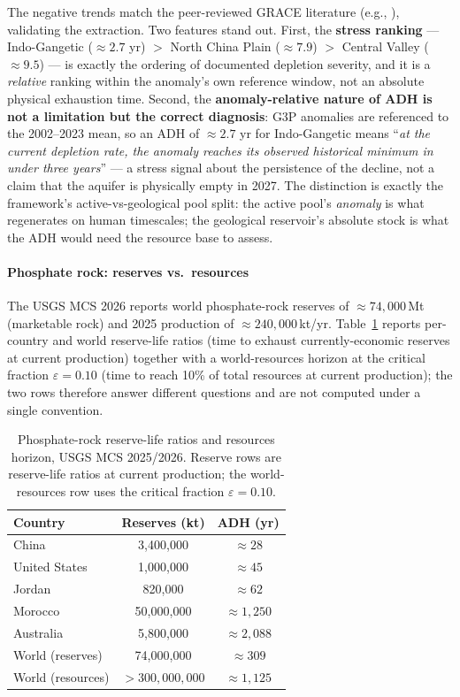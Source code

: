 \documentclass[twocolumn,10pt]{article}
\begin{document}
The negative trends match the peer-reviewed GRACE literature (e.g., \cite{rodell2018}), validating the extraction. Two features stand out. First, the \textbf{stress ranking} --- Indo-Gangetic ($\approx2.7$ yr) $>$ North China Plain ($\approx7.9$) $>$ Central Valley ($\approx9.5$) --- is exactly the ordering of documented depletion severity, and it is a \emph{relative} ranking within the anomaly's own reference window, not an absolute physical exhaustion time. Second, the \textbf{anomaly-relative nature of ADH is not a limitation but the correct diagnosis}: G3P anomalies are referenced to the 2002--2023 mean, so an ADH of $\approx2.7$ yr for Indo-Gangetic means ``\emph{at the current depletion rate, the anomaly reaches its observed historical minimum in under three years}'' --- a stress signal about the persistence of the decline, not a claim that the aquifer is physically empty in 2027. The distinction is exactly the framework's active-vs-geological pool split: the active pool's \emph{anomaly} is what regenerates on human timescales; the geological reservoir's absolute stock is what the ADH would need the resource base to assess.

\paragraph{Phosphate rock: reserves vs.\ resources}
\label{sec:adh-phosphate}

The USGS MCS 2026 reports world phosphate-rock reserves of $\approx 74{,}000$\,Mt (marketable rock) and 2025 production of $\approx 240{,}000$\,kt/yr. Table~\ref{tab:adh-phos} reports per-country and world reserve-life ratios (time to exhaust currently-economic reserves at current production) together with a world-resources horizon at the critical fraction $\varepsilon=0.10$ (time to reach 10\% of total resources at current production); the two rows therefore answer different questions and are not computed under a single convention.

\begin{table}[h]
\centering
\small
\caption{Phosphate-rock reserve-life ratios and resources horizon, USGS MCS 2025/2026. Reserve rows are reserve-life ratios at current production; the world-resources row uses the critical fraction $\varepsilon=0.10$.}
\label{tab:adh-phos}
\begin{tabular}{lcc}
\toprule
Country & Reserves (kt) & ADH (yr) \\
\midrule
China & 3,400,000 & $\approx 28$ \\
United States & 1,000,000 & $\approx 45$ \\
Jordan & 820,000 & $\approx 62$ \\
Morocco & 50,000,000 & $\approx 1{,}250$ \\
Australia & 5,800,000 & $\approx 2{,}088$ \\
\midrule
World (reserves) & 74,000,000 & $\approx 309$ \\
World (resources) & $>300{,}000{,}000$ & $\approx 1{,}125$ \\
\bottomrule
\end{tabular}
\end{table}
\end{document}
